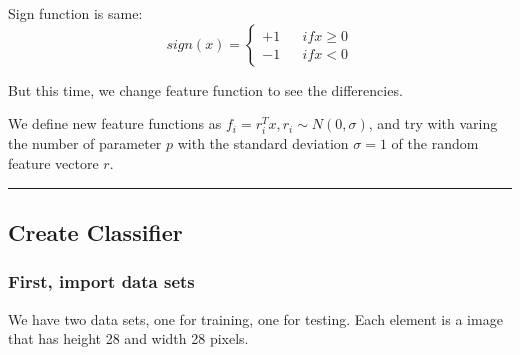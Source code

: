 \documentclass[11pt]{article}
\begin{document}
Sign function is same: \[ sign(x)=\left\{
\begin{aligned}
+1 & & if  x \geq 0 \\
-1 & & if  x < 0 
\end{aligned}
\right.
\]

But this time, we change feature function to see the differencies.

We define new feature functions as
\(f_{i} = r_{i}^{T}x, r_{i} \sim N(0, \sigma)\), and try with varing the
number of parameter \(p\) with the standard deviation \(\sigma = 1\) of
the random feature vectore \(r\).

\begin{center}\rule{0.5\linewidth}{\linethickness}\end{center}

    \subsection{Create Classifier}\label{create-classifier}

\subsubsection{First, import data sets}\label{first-import-data-sets}

We have two data sets, one for training, one for testing. Each element
is a image that has height 28 and width 28 pixels.
\end{document}
